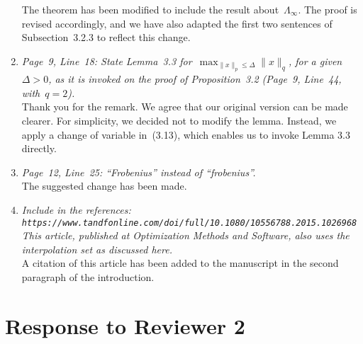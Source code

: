 \documentclass{article}
\begin{document}
\begin{enumerate}
    The theorem has been modified to include the result about~$\Lambda_{\infty}$.
    The proof is revised accordingly, and we have also adapted the first two sentences of Subsection~3.2.3 to reflect this change.
    \item \textit{Page~9, Line~18: State Lemma~3.3 for~$\max_{\lVert x \rVert_p \le \Delta} \lVert x \rVert_q$, for a given~$\Delta > 0$, as it is invoked on the proof of Proposition~3.2 (Page~9, Line~44, with~$q = 2$).}\\
    Thank you for the remark.
    We agree that our original version can be made clearer.
    For simplicity, we decided not to modify the lemma.
    Instead, we apply a change of variable in~(3.13), which enables us to invoke Lemma 3.3 directly.
    \item \textit{Page~12, Line~25: ``Frobenius'' instead of ``frobenius''.}\\
    The suggested change has been made.
    \item \textit{Include in the references:\\ \texttt{https://www.tandfonline.com/doi/full/10.1080/10556788.2015.1026968}\\ This article, published at Optimization Methods and Software, also uses the interpolation set as discussed here.}\\
    A citation of this article has been added to the manuscript in the second paragraph of the introduction.
\end{enumerate}

\section{Response to Reviewer 2}
\end{document}
